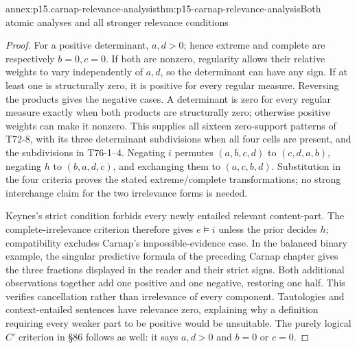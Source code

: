 \begin{annexitem}{annex:p15.carnap-relevance-analysis}{thm:p15-carnap-relevance-analysis}{Both atomic analyses and all stronger relevance conditions}
\begin{proof}
For a positive determinant, \(a,d>0\); hence extreme and complete
are respectively \(b=0,c=0\). If both are nonzero, regularity
allows their relative weights to vary independently of \(a,d\),
so the determinant can have any sign. If at least one is structurally
zero, it is positive for every regular measure. Reversing the products
gives the negative cases. A determinant is zero for every regular
measure exactly when both products are structurally zero; otherwise
positive weights can make it nonzero. This supplies all sixteen
zero-support patterns of T72-8, with its three determinant subdivisions
when all four cells are present, and the subdivisions in T76-1--4.
Negating \(i\) permutes \((a,b,c,d)\) to \((c,d,a,b)\),
negating \(h\) to \((b,a,d,c)\), and exchanging them to
\((a,c,b,d)\). Substitution in the four criteria proves the
stated extreme/complete transformations; no strong interchange claim
for the two irrelevance forms is needed.

Keynes's strict condition forbids every newly entailed relevant
content-part. The complete-irrelevance criterion therefore gives
\(e\models i\) unless the prior decides \(h\); compatibility
excludes Carnap's impossible-evidence case. In the balanced binary
example, the singular predictive formula of the preceding Carnap
chapter gives the three fractions displayed in the reader and their
strict signs. Both additional observations together add one positive
and one negative, restoring one half. This verifies cancellation rather
than irrelevance of every component. Tautologies and context-entailed
sentences have relevance zero, explaining why a definition requiring
every weaker part to be positive would be unsuitable. The purely
logical \(C'\) criterion in §86 follows as well: it says
\(a,d>0\) and \(b=0\) or \(c=0\).
\end{proof}
\end{annexitem}

